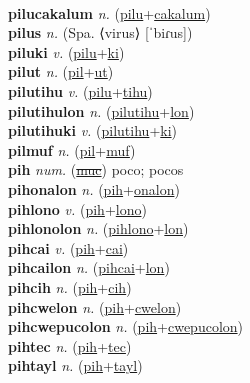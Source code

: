  \label{pilulyan} \\
\textbf{pilucakalum} \textit{n.} (\hyperref[pilu]{pilu}+\hyperref[cakalum]{cakalum})
 \label{pilucakalum} \\
\textbf{pilus} \textit{n.} (Spa. ⟨virus⟩ [ˈbiɾus])
 \label{pilus} \\
\textbf{piluki} \textit{v.} (\hyperref[pilu]{pilu}+\hyperref[ki]{ki})
 \label{piluki} \\
\textbf{pilut} \textit{n.} (\hyperref[pil]{pil}+\hyperref[ut]{ut})
 \label{pilut} \\
\textbf{pilutihu} \textit{v.} (\hyperref[pilu]{pilu}+\hyperref[tihu]{tihu})
 \label{pilutihu} \\
\textbf{pilutihulon} \textit{n.} (\hyperref[pilutihu]{pilutihu}+\hyperref[lon]{lon})
 \label{pilutihulon} \\
\textbf{pilutihuki} \textit{v.} (\hyperref[pilutihu]{pilutihu}+\hyperref[ki]{ki})
 \label{pilutihuki} \\
\textbf{pilmuf} \textit{n.} (\hyperref[pil]{pil}+\hyperref[muf]{muf})
 \label{pilmuf} \\
\textbf{pih} \textit{num.} (\hyperref[muc]{\sout{muc}})
poco; pocos \label{pih} \\
\textbf{pihonalon} \textit{n.} (\hyperref[pih]{pih}+\hyperref[onalon]{onalon})
 \label{pihonalon} \\
\textbf{pihlono} \textit{v.} (\hyperref[pih]{pih}+\hyperref[lono]{lono})
 \label{pihlono} \\
\textbf{pihlonolon} \textit{n.} (\hyperref[pihlono]{pihlono}+\hyperref[lon]{lon})
 \label{pihlonolon} \\
\textbf{pihcai} \textit{v.} (\hyperref[pih]{pih}+\hyperref[cai]{cai})
 \label{pihcai} \\
\textbf{pihcailon} \textit{n.} (\hyperref[pihcai]{pihcai}+\hyperref[lon]{lon})
 \label{pihcailon} \\
\textbf{pihcih} \textit{n.} (\hyperref[pih]{pih}+\hyperref[cih]{cih})
 \label{pihcih} \\
\textbf{pihcwelon} \textit{n.} (\hyperref[pih]{pih}+\hyperref[cwelon]{cwelon})
 \label{pihcwelon} \\
\textbf{pihcwepucolon} \textit{n.} (\hyperref[pih]{pih}+\hyperref[cwepucolon]{cwepucolon})
 \label{pihcwepucolon} \\
\textbf{pihtec} \textit{n.} (\hyperref[pih]{pih}+\hyperref[tec]{tec})
 \label{pihtec} \\
\textbf{pihtayl} \textit{n.} (\hyperref[pih]{pih}+\hyperref[tayl]{tayl})
 \label{pihtayl} \\
